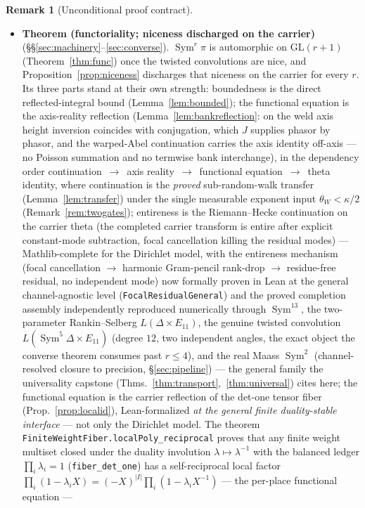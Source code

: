\documentclass[11pt]{article}
\theoremstyle{definition}
\newtheorem{remark}[theorem]{Remark}
\newcommand{\Sym}{\operatorname{Sym}}
\begin{document}
\begin{remark}[Unconditional proof contract]
\begin{enumerate}
\begin{itemize}
\item \textbf{Theorem (functoriality; niceness discharged on the carrier)}
(\S\S\ref{sec:machinery}--\ref{sec:converse}). $\Sym^r\pi$ is automorphic on $\mathrm{GL}(r+1)$
(Theorem~\ref{thm:func}) once the twisted convolutions are nice, and Proposition~\ref{prop:niceness}
discharges that niceness on the carrier for every $r$. Its three parts stand at their own strength:
boundedness is the direct reflected-integral bound (Lemma~\ref{lem:bounded}); the functional equation is the
axis-reality reflection (Lemma~\ref{lem:bankreflection}: on the weld axis height inversion coincides with
conjugation, which $J$ supplies phasor by phasor, and the warped-Abel continuation carries the axis identity
off-axis --- no Poisson summation and no termwise bank interchange), in the dependency order
continuation~$\to$~axis reality~$\to$~functional equation~$\to$~theta identity, where continuation is the
\emph{proved} sub-random-walk transfer (Lemma~\ref{lem:transfer}) under the single measurable exponent input
$\theta_W<\kappa/2$ (Remark~\ref{rem:twogates}); entireness is the Riemann--Hecke
continuation on the carrier theta (the completed carrier transform is entire after explicit constant-mode
subtraction, focal cancellation killing the residual modes) --- Mathlib-complete for the Dirichlet model,
with the entireness mechanism (focal cancellation $\to$ harmonic Gram-pencil rank-drop $\to$ residue-free
residual, no independent mode) now formally proven in Lean at the general channel-agnostic level
(\texttt{FocalResidualGeneral}) and the proved completion assembly independently reproduced numerically through $\Sym^{13}$, the
two-parameter Rankin--Selberg $L(\Delta\times E_{11})$, the genuine twisted convolution $L(\Sym^5\Delta\times E_{11})$ (degree $12$, two independent angles, the exact object the converse theorem consumes past $r\le4$), and the real Maass $\Sym^2$ (channel-resolved closure to
precision, \S\ref{sec:pipeline}) --- the general family the universality capstone
(Thms.~\ref{thm:transport},~\ref{thm:universal}) cites here; the
functional equation is the carrier reflection of the det-one tensor fiber (Prop.~\ref{prop:localid}),
Lean-formalized \emph{at the general finite duality-stable interface} --- not only the Dirichlet model.
The theorem \texttt{FiniteWeightFiber.localPoly\_reciprocal} proves that any finite weight multiset
closed under the duality involution $\lambda\mapsto\lambda^{-1}$ with the balanced ledger
$\prod_i\lambda_i=1$ (\texttt{fiber\_det\_one}) has a self-reciprocal local factor
$\prod_i(1-\lambda_i X)=(-X)^{|I|}\prod_i(1-\lambda_i X^{-1})$ --- the per-place functional equation ---

\end{itemize}
\end{enumerate}
\end{remark}
\end{document}
